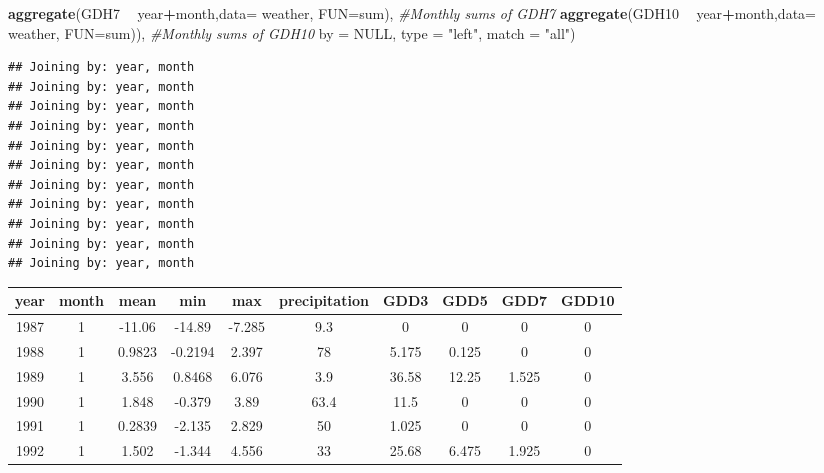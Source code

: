 \documentclass[10pt,]{article}
\newenvironment{Shaded}{\begin{snugshade}}{\end{snugshade}}
\newcommand{\KeywordTok}[1]{\textcolor[rgb]{0.13,0.29,0.53}{\textbf{#1}}}
\newcommand{\DataTypeTok}[1]{\textcolor[rgb]{0.13,0.29,0.53}{#1}}
\newcommand{\DecValTok}[1]{\textcolor[rgb]{0.00,0.00,0.81}{#1}}
\newcommand{\StringTok}[1]{\textcolor[rgb]{0.31,0.60,0.02}{#1}}
\newcommand{\CommentTok}[1]{\textcolor[rgb]{0.56,0.35,0.01}{\textit{#1}}}
\newcommand{\OtherTok}[1]{\textcolor[rgb]{0.56,0.35,0.01}{#1}}
\newcommand{\OperatorTok}[1]{\textcolor[rgb]{0.81,0.36,0.00}{\textbf{#1}}}
\newcommand{\NormalTok}[1]{#1}
\begin{document}
\begin{Shaded}
\begin{Highlighting}[]
    \KeywordTok{aggregate}\NormalTok{(GDH7 }\OperatorTok{~}\StringTok{ }\NormalTok{year}\OperatorTok{+}\NormalTok{month,}\DataTypeTok{data=}\NormalTok{ weather, }\DataTypeTok{FUN=}\NormalTok{sum),          }\CommentTok{#Monthly sums of GDH7}
    \KeywordTok{aggregate}\NormalTok{(GDH10 }\OperatorTok{~}\StringTok{ }\NormalTok{year}\OperatorTok{+}\NormalTok{month,}\DataTypeTok{data=}\NormalTok{ weather, }\DataTypeTok{FUN=}\NormalTok{sum)),        }\CommentTok{#Monthly sums of GDH10       }
    \DataTypeTok{by =} \OtherTok{NULL}\NormalTok{, }\DataTypeTok{type =} \StringTok{"left"}\NormalTok{, }\DataTypeTok{match =} \StringTok{"all"}\NormalTok{)}
\end{Highlighting}
\end{Shaded}

\begin{verbatim}
## Joining by: year, month
## Joining by: year, month
## Joining by: year, month
## Joining by: year, month
## Joining by: year, month
## Joining by: year, month
## Joining by: year, month
## Joining by: year, month
## Joining by: year, month
## Joining by: year, month
## Joining by: year, month
\end{verbatim}

\begin{Shaded}
\end{Shaded}

\begin{longtable}[]{@{}cccccccccc@{}}
\toprule
year & month & mean & min & max & precipitation & GDD3 & GDD5 & GDD7 &
GDD10\tabularnewline
\midrule
\endhead
1987 & 1 & -11.06 & -14.89 & -7.285 & 9.3 & 0 & 0 & 0 & 0\tabularnewline
1988 & 1 & 0.9823 & -0.2194 & 2.397 & 78 & 5.175 & 0.125 & 0 &
0\tabularnewline
1989 & 1 & 3.556 & 0.8468 & 6.076 & 3.9 & 36.58 & 12.25 & 1.525 &
0\tabularnewline
1990 & 1 & 1.848 & -0.379 & 3.89 & 63.4 & 11.5 & 0 & 0 &
0\tabularnewline
1991 & 1 & 0.2839 & -2.135 & 2.829 & 50 & 1.025 & 0 & 0 &
0\tabularnewline
1992 & 1 & 1.502 & -1.344 & 4.556 & 33 & 25.68 & 6.475 & 1.925 &
0\tabularnewline
\bottomrule
\end{longtable}
\end{document}
